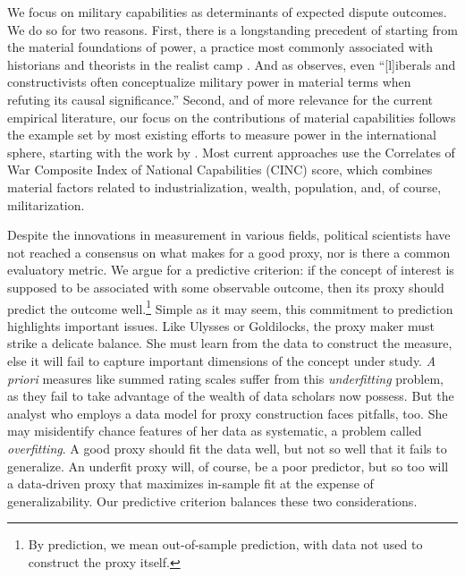 We focus on military capabilities as determinants of expected dispute outcomes.
We do so for two reasons.
First, there is a longstanding precedent of starting from the material foundations of power, a practice most commonly associated with historians and theorists in the realist camp \citep{morgenthau,taylor,carr}.
And as \citet[46]{beckley2010economic} observes, even ``[l]iberals and constructivists often conceptualize military power in material terms when refuting its causal significance.''
Second, and of more relevance for the current empirical literature, our focus on the contributions of material capabilities follows the example set by most existing efforts to measure power in the international sphere, starting with the work by \citet{singer1972}.
Most current approaches use the Correlates of War Composite Index of National Capabilities (CINC) score, which combines material factors related to industrialization, wealth, population, and, of course, militarization.

Despite the innovations in measurement in various fields, political scientists have not reached a consensus on what makes for a good proxy, nor is there a common evaluatory metric.
We argue for a predictive criterion:  if the concept of interest is supposed to be associated with some observable outcome, then its proxy should predict the outcome well.\footnote{%
  By prediction, we mean out-of-sample prediction, with data not used to construct the proxy itself.
}
Simple as it may seem, this commitment to prediction highlights important issues.
Like Ulysses or Goldilocks, the proxy maker must strike a delicate balance.
She must learn from the data to construct the measure, else it will fail to capture important dimensions of the concept under study.
\emph{A priori} measures like summed rating scales suffer from this \emph{underfitting} problem, as they fail to take advantage of the wealth of data scholars now possess.
But the analyst who employs a data model for proxy construction faces pitfalls, too.
She may misidentify chance features of her data as systematic, a problem called \emph{overfitting}.
A good proxy should fit the data well, but not so well that it fails to generalize.
An underfit proxy will, of course, be a poor predictor, but so too will a data-driven proxy that maximizes in-sample fit at the expense of generalizability.
Our predictive criterion balances these two considerations.

